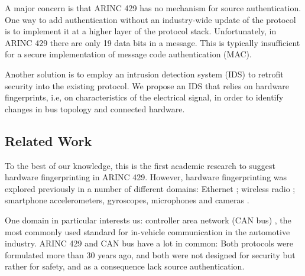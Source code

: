 \documentclass[english]{llncs}
\newcommand{\sublevel}[1]{\subsection{#1}}
\newcommand{\sublevel}[1]{\section{#1}}
\begin{document}
  A major concern is that ARINC 429 has no mechanism for source authentication.
  One way to add authentication without an industry-wide update of the protocol is to implement it at a higher layer of the protocol stack. Unfortunately, in ARINC 429 there are only 19 data bits in a message. This is typically insufficient for a secure implementation of message code authentication (MAC).
  
  Another solution is to employ an intrusion detection system (IDS) to retrofit security into the existing protocol. We propose an IDS that relies on hardware fingerprints, i.e, on characteristics of the electrical signal, in order to identify changes in bus topology and connected hardware.
  

\sublevel{Related Work} \label{RelatedWork}
  To the best of our knowledge, this is the first academic research to suggest hardware fingerprinting in ARINC 429. However, hardware fingerprinting was explored previously in a number of different domains: Ethernet \cite{kohno2005remote, uluagac2013passive, gerdes2012physical}; wireless radio \cite{ellis2001characteristics, brik2008wireless, xu2015device}; smartphone accelerometers, gyroscopes, microphones and cameras \cite{dey2014accelprint, das2016tracking}.
  
  One domain in particular interests
  us: controller area network (CAN bus) \cite{bosch1991canbus}, the most commonly used standard for in-vehicle communication in the automotive industry. ARINC 429 and CAN bus have a lot in common: Both protocols were formulated more than 30 years ago, and both were not designed for security but rather for safety, and as a consequence lack source authentication.
  
\end{document}
